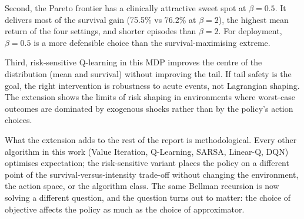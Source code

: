 Second, the Pareto frontier has a clinically attractive sweet spot at $\beta = 0.5$. It delivers most of the survival gain (75.5\% vs 76.2\% at $\beta = 2$), the highest mean return of the four settings, and shorter episodes than $\beta = 2$. For deployment, $\beta = 0.5$ is a more defensible choice than the survival-maximising extreme.

Third, risk-sensitive Q-learning in this MDP improves the centre of the distribution (mean and survival) without improving the tail. If tail safety is the goal, the right intervention is robustness to acute events, not Lagrangian shaping. The extension shows the limits of risk shaping in environments where worst-case outcomes are dominated by exogenous shocks rather than by the policy's action choices.

What the extension adds to the rest of the report is methodological. Every other algorithm in this work (Value Iteration, Q-Learning, SARSA, Linear-Q, DQN) optimises expectation; the risk-sensitive variant places the policy on a different point of the survival-versus-intensity trade-off without changing the environment, the action space, or the algorithm class. The same Bellman recursion is now solving a different question, and the question turns out to matter: the choice of objective affects the policy as much as the choice of approximator.
